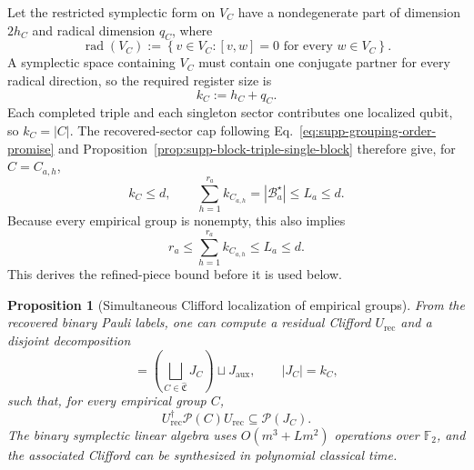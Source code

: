 \documentclass[
  aps,
  prx,
  reprint,
  superscriptaddress,
  amsmath,
  amssymb,
  nofootinbib,
  longbibliography
]{revtex4-2}
\newtheorem{proposition}[theorem]{Proposition}
\newcommand{\Pc}{\mathcal{P}}
\newcommand{\Fc}{\mathbb{F}_2}
\begin{document}
Let the restricted symplectic form on $V_C$ have a nondegenerate part of
dimension $2h_C$ and radical dimension $q_C$, where
\begin{equation}
\operatorname{rad}(V_C)
:=
\left\{
v\in V_C :
[v,w]=0
\text{ for every } w\in V_C
\right\}.  
\end{equation}
A symplectic space
containing $V_C$ must contain one conjugate partner for every radical
direction, so the required register size is
\begin{equation}
k_C:=h_C+q_C.
\label{eq:supp-empirical-register-size}
\end{equation}
Each completed triple and each singleton sector contributes one localized
qubit, so $k_C=|C|$.  The recovered-sector cap following
Eq.~\eqref{eq:supp-grouping-order-promise} and
Proposition~\ref{prop:supp-block-triple-single-block} therefore give, for
$C=C_{a,h}$,
\begin{equation}
k_C\le d,
\qquad
\sum_{h=1}^{r_a}k_{C_{a,h}}
=
|\mathcal B_a^\star|
\le
L_a
\le
d.
\label{eq:supp-empirical-register-size-bounds}
\end{equation}
Because every empirical group is nonempty, this also implies
\begin{equation}
r_a
\le
\sum_{h=1}^{r_a}k_{C_{a,h}}
\le L_a\le d.
\label{eq:supp-refined-piece-count-bound}
\end{equation}
This derives the refined-piece bound before it is used below.

\begin{proposition}[Simultaneous Clifford localization of empirical groups]
\label{prop:supp-simultaneous-empirical-localization}
From the recovered binary Pauli labels, one can compute a residual Clifford
$U_{\mathrm{rec}}$ and a disjoint decomposition
\begin{equation}
[m]
=
\left(
\bigsqcup_{C\in\widehat{\mathfrak C}}J_C
\right)
\sqcup J_{\mathrm{aux}},
\qquad
|J_C|=k_C,
\label{eq:supp-empirical-localized-register-decomposition}
\end{equation}
such that, for every empirical group $C$,
\begin{equation}
U_{\mathrm{rec}}^\dagger\mathcal P(C)U_{\mathrm{rec}}
\subseteq\Pc(J_C). 
\label{eq:supp-simultaneous-empirical-localization}
\end{equation}
The binary symplectic linear algebra uses
$O(m^3+Lm^2)$ operations over $\Fc$, and the associated Clifford can be
synthesized in polynomial classical time.
\end{proposition}
\end{document}
